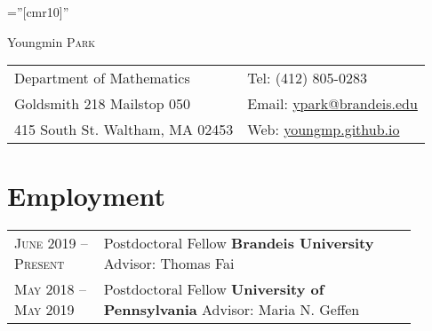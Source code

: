 \documentclass[a4paper,10pt]{article}
\begin{document}

\pagestyle{empty} %

\font\fb=''[cmr10]'' %

\par{\centering
		{\Large Youngmin \textsc{Park}
	}\par}


\begin{center}
\begin{tabularx}{.8\textwidth}{Xl}
Department of Mathematics & Tel: (412) 805-0283 \\
Goldsmith 218 Mailstop 050 & Email: \href{mailto:ypark@brandeis.edu}{ypark@brandeis.edu}\\
415 South St. Waltham, MA 02453  & Web: \href{https://youngmp.github.io}{youngmp.github.io}\\
\end{tabularx}
\end{center}


\section{Employment}
\begin{tabular}{p{0.2\linewidth}p{0.7\linewidth}}
 \textsc{June} 2019 -- \textsc{Present}  & Postdoctoral Fellow \textbf{Brandeis University}\newline
\small Advisor: Thomas Fai\vspace{8pt}\\
 \textsc{May} 2018 -- \textsc{May} 2019  & Postdoctoral Fellow \textbf{University of Pennsylvania}\newline
\small Advisor: Maria N. Geffen
\end{tabular}

\end{document}
